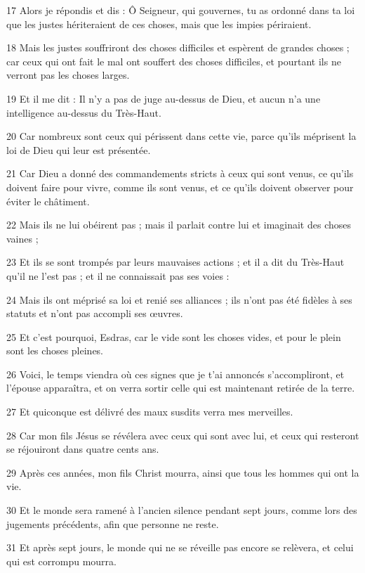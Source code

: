 \par 17 Alors je répondis et dis : Ô Seigneur, qui gouvernes, tu as ordonné dans ta loi que les justes hériteraient de ces choses, mais que les impies périraient.
\par 18 Mais les justes souffriront des choses difficiles et espèrent de grandes choses ; car ceux qui ont fait le mal ont souffert des choses difficiles, et pourtant ils ne verront pas les choses larges.
\par 19 Et il me dit : Il n’y a pas de juge au-dessus de Dieu, et aucun n’a une intelligence au-dessus du Très-Haut.
\par 20 Car nombreux sont ceux qui périssent dans cette vie, parce qu'ils méprisent la loi de Dieu qui leur est présentée.
\par 21 Car Dieu a donné des commandements stricts à ceux qui sont venus, ce qu'ils doivent faire pour vivre, comme ils sont venus, et ce qu'ils doivent observer pour éviter le châtiment.
\par 22 Mais ils ne lui obéirent pas ; mais il parlait contre lui et imaginait des choses vaines ;
\par 23 Et ils se sont trompés par leurs mauvaises actions ; et il a dit du Très-Haut qu'il ne l'est pas ; et il ne connaissait pas ses voies :
\par 24 Mais ils ont méprisé sa loi et renié ses alliances ; ils n'ont pas été fidèles à ses statuts et n'ont pas accompli ses œuvres.
\par 25 Et c'est pourquoi, Esdras, car le vide sont les choses vides, et pour le plein sont les choses pleines.
\par 26 Voici, le temps viendra où ces signes que je t'ai annoncés s'accompliront, et l'épouse apparaîtra, et on verra sortir celle qui est maintenant retirée de la terre.
\par 27 Et quiconque est délivré des maux susdits verra mes merveilles.
\par 28 Car mon fils Jésus se révélera avec ceux qui sont avec lui, et ceux qui resteront se réjouiront dans quatre cents ans.
\par 29 Après ces années, mon fils Christ mourra, ainsi que tous les hommes qui ont la vie.
\par 30 Et le monde sera ramené à l'ancien silence pendant sept jours, comme lors des jugements précédents, afin que personne ne reste.
\par 31 Et après sept jours, le monde qui ne se réveille pas encore se relèvera, et celui qui est corrompu mourra.
